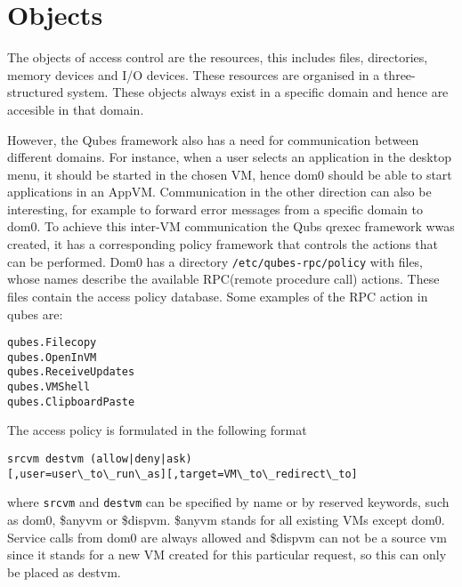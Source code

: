 \documentclass[runningheads,a4paper]{article}
\begin{document}
\section{Objects}

The objects of access control are the resources, this includes files, directories,
memory devices and I/O devices. These resources are organised in a
three-structured system.  These objects always exist
in a specific domain and hence are accesible in that domain. 

However, the Qubes framework also has a need for communication between
different domains. For instance, when a user selects an application in
the desktop menu, it should be started in the chosen VM, hence dom0
should be able to start applications in an AppVM. Communication in the
other direction can also be interesting, for example to forward error
messages from a specific domain to dom0. To achieve this inter-VM
communication the Qubs qrexec framework wwas created, it has a
corresponding policy framework that controls the actions that can be
performed. Dom0 has a directory \texttt{/etc/qubes-rpc/policy} with
files, whose names describe the available RPC(remote procedure call)
actions. These files contain the access policy database. Some examples
of the RPC action in qubes are:
\begin{verbatim}
qubes.Filecopy
qubes.OpenInVM
qubes.ReceiveUpdates
qubes.VMShell
qubes.ClipboardPaste
\end{verbatim} 
The access policy is formulated in the following format
\begin{verbatim}
srcvm destvm (allow|deny|ask)
[,user=user\_to\_run\_as][,target=VM\_to\_redirect\_to]
\end{verbatim}
where \texttt{srcvm} and \texttt{destvm} can be specified by name or
by reserved keywords, such as dom0, \$anyvm or \$dispvm. \$anyvm
stands for all existing VMs except dom0. Service calls
from dom0 are always allowed and \$dispvm can not be a source vm since
it stands for a new VM created for this particular request, so this
can only be placed as destvm.
\end{document}
